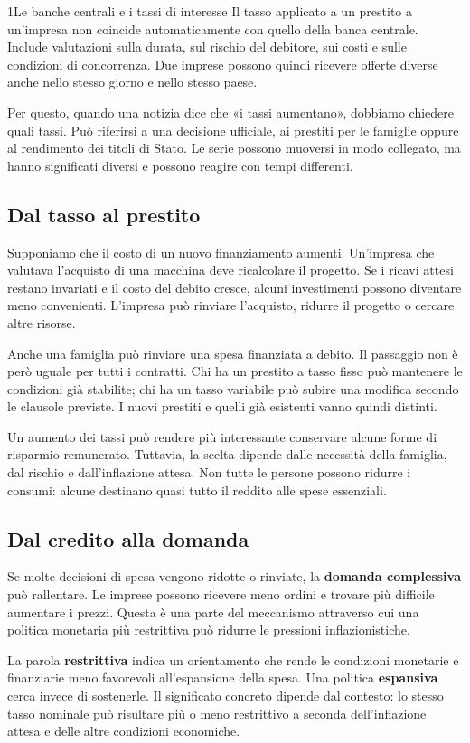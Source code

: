 \begin{lettura}{1}{Le banche centrali e i tassi di interesse}
Il tasso applicato a un prestito a un'impresa non coincide automaticamente con quello della banca centrale. Include valutazioni sulla durata, sul rischio del debitore, sui costi e sulle condizioni di concorrenza. Due imprese possono quindi ricevere offerte diverse anche nello stesso giorno e nello stesso paese.

Per questo, quando una notizia dice che «i tassi aumentano», dobbiamo chiedere quali tassi. Può riferirsi a una decisione ufficiale, ai prestiti per le famiglie oppure al rendimento dei titoli di Stato. Le serie possono muoversi in modo collegato, ma hanno significati diversi e possono reagire con tempi differenti.

\subsection*{Dal tasso al prestito}
Supponiamo che il costo di un nuovo finanziamento aumenti. Un'impresa che valutava l'acquisto di una macchina deve ricalcolare il progetto. Se i ricavi attesi restano invariati e il costo del debito cresce, alcuni investimenti possono diventare meno convenienti. L'impresa può rinviare l'acquisto, ridurre il progetto o cercare altre risorse.

Anche una famiglia può rinviare una spesa finanziata a debito. Il passaggio non è però uguale per tutti i contratti. Chi ha un prestito a tasso fisso può mantenere le condizioni già stabilite; chi ha un tasso variabile può subire una modifica secondo le clausole previste. I nuovi prestiti e quelli già esistenti vanno quindi distinti.

Un aumento dei tassi può rendere più interessante conservare alcune forme di risparmio remunerato. Tuttavia, la scelta dipende dalle necessità della famiglia, dal rischio e dall'inflazione attesa. Non tutte le persone possono ridurre i consumi: alcune destinano quasi tutto il reddito alle spese essenziali.

\subsection*{Dal credito alla domanda}
Se molte decisioni di spesa vengono ridotte o rinviate, la \textbf{domanda complessiva} può rallentare. Le imprese possono ricevere meno ordini e trovare più difficile aumentare i prezzi. Questa è una parte del meccanismo attraverso cui una politica monetaria più restrittiva può ridurre le pressioni inflazionistiche.

La parola \textbf{restrittiva} indica un orientamento che rende le condizioni monetarie e finanziarie meno favorevoli all'espansione della spesa. Una politica \textbf{espansiva} cerca invece di sostenerle. Il significato concreto dipende dal contesto: lo stesso tasso nominale può risultare più o meno restrittivo a seconda dell'inflazione attesa e delle altre condizioni economiche.


\end{lettura}
